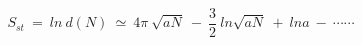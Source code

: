 \begin{equation}
S_{st} ~=~ ln~d(N) ~\simeq~ 4\pi ~\sqrt{aN} ~-~ \frac{3}{2}~ln \sqrt{aN} ~+
~lna ~ - 
~\cdots  \cdots
\end{equation}

